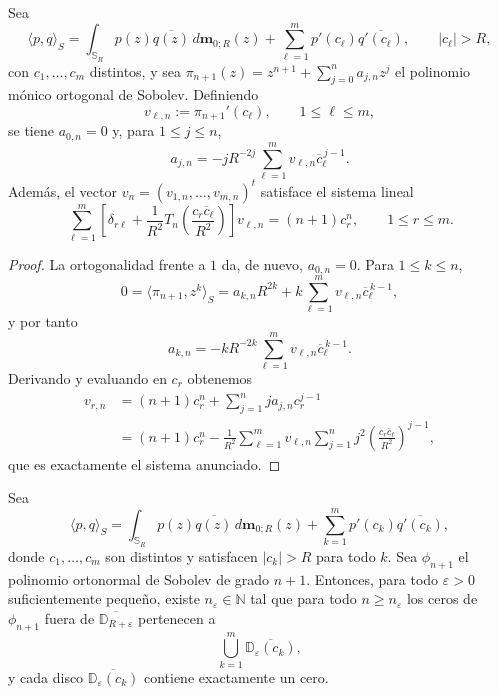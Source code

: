 \begin{lem}\label{lem:sistema_finito_atraccion}
	Sea
	\[
		\langle p,q\rangle_S
		=
		\int_{\mathbb S_R}p(z)\overline{q(z)}\,d\mathbf m_{0;R}(z)
		+
		\sum_{\ell=1}^m p'(c_\ell)\overline{q'(c_\ell)},
		\qquad |c_\ell|>R,
	\]
	con $c_1,\dots,c_m$ distintos, y sea $\pi_{n+1}(z)=z^{n+1}+\sum_{j=0}^n a_{j,n}z^j$ el polinomio mónico ortogonal de Sobolev.
	Definiendo
	\[
		v_{\ell,n}:=\pi_{n+1}'(c_\ell),
		\qquad 1\le \ell\le m,
	\]
	se tiene $a_{0,n}=0$ y, para $1\le j\le n$,
	\[
		a_{j,n}=-jR^{-2j}\sum_{\ell=1}^m v_{\ell,n}\overline c_\ell^{\,j-1}.
	\]
	Además, el vector $v_n=(v_{1,n},\dots,v_{m,n})^t$ satisface el sistema lineal
	\[
		\sum_{\ell=1}^m
		\left[
			\delta_{r\ell}+
			\frac1{R^2}T_n\!\left(\frac{c_r\overline c_\ell}{R^2}\right)
			\right]v_{\ell,n}
		=(n+1)c_r^n,
		\qquad 1\le r\le m.
	\]
\end{lem}

\begin{proof}
	La ortogonalidad frente a $1$ da, de nuevo, $a_{0,n}=0$. Para $1\le k\le n$,
	\[
		0=\langle \pi_{n+1},z^k\rangle_S
		=a_{k,n}R^{2k}+k\sum_{\ell=1}^m v_{\ell,n}\overline c_\ell^{\,k-1},
	\]
	y por tanto
	\[
		a_{k,n}=-kR^{-2k}\sum_{\ell=1}^m v_{\ell,n}\overline c_\ell^{\,k-1}.
	\]
	Derivando y evaluando en $c_r$ obtenemos
	\begin{align*}
		v_{r,n}
		 & =(n+1)c_r^n+\sum_{j=1}^n ja_{j,n}c_r^{j-1} \\
		 & =(n+1)c_r^n-
		\frac1{R^2}
		\sum_{\ell=1}^m v_{\ell,n}
		\sum_{j=1}^n j^2\left(\frac{c_r\overline c_\ell}{R^2}\right)^{j-1},
	\end{align*}
	que es exactamente el sistema anunciado.
\end{proof}

\begin{thm}\label{thm:atraccion}
	Sea
	\[
		\langle p,q\rangle_S
		=
		\int_{\mathbb S_R}p(z)\overline{q(z)}\,d\mathbf m_{0;R}(z)
		+
		\sum_{k=1}^m p'(c_k)\overline{q'(c_k)},
	\]
	donde $c_1,\dots,c_m$ son distintos y satisfacen $|c_k|>R$ para todo $k$.
	Sea $\phi_{n+1}$ el polinomio ortonormal de Sobolev de grado $n+1$.
	Entonces, para todo $\varepsilon>0$ suficientemente pequeño, existe $n_\varepsilon\in\mathbb N$ tal que para todo $n\ge n_\varepsilon$ los ceros de $\phi_{n+1}$ fuera de $\overline{\mathbb D_{R+\varepsilon}}$ pertenecen a
	\[
		\bigcup_{k=1}^m\overline{\mathbb D_\varepsilon(c_k)},
	\]
	y cada disco $\overline{\mathbb D_\varepsilon(c_k)}$ contiene exactamente un cero.
\end{thm}

